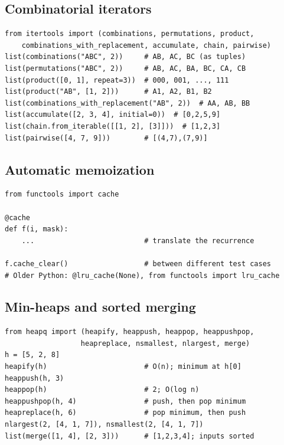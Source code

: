 \subsection{Combinatorial iterators}
\begin{lstlisting}[label=py:itertools]
from itertools import (combinations, permutations, product,
    combinations_with_replacement, accumulate, chain, pairwise)
list(combinations("ABC", 2))     # AB, AC, BC (as tuples)
list(permutations("ABC", 2))     # AB, AC, BA, BC, CA, CB
list(product([0, 1], repeat=3))  # 000, 001, ..., 111
list(product("AB", [1, 2]))      # A1, A2, B1, B2
list(combinations_with_replacement("AB", 2))  # AA, AB, BB
list(accumulate([2, 3, 4], initial=0))  # [0,2,5,9]
list(chain.from_iterable([[1, 2], [3]]))  # [1,2,3]
list(pairwise([4, 7, 9]))        # [(4,7),(7,9)]
\end{lstlisting}

\subsection{Automatic memoization}
\begin{lstlisting}[label=py:cache]
from functools import cache

@cache
def f(i, mask):
    ...                          # translate the recurrence

f.cache_clear()                  # between different test cases
# Older Python: @lru_cache(None), from functools import lru_cache
\end{lstlisting}

\subsection{Min-heaps and sorted merging}
\begin{lstlisting}[label=py:heap]
from heapq import (heapify, heappush, heappop, heappushpop,
                  heapreplace, nsmallest, nlargest, merge)
h = [5, 2, 8]
heapify(h)                       # O(n); minimum at h[0]
heappush(h, 3)
heappop(h)                       # 2; O(log n)
heappushpop(h, 4)                # push, then pop minimum
heapreplace(h, 6)                # pop minimum, then push
nlargest(2, [4, 1, 7]), nsmallest(2, [4, 1, 7])
list(merge([1, 4], [2, 3]))      # [1,2,3,4]; inputs sorted
\end{lstlisting}

